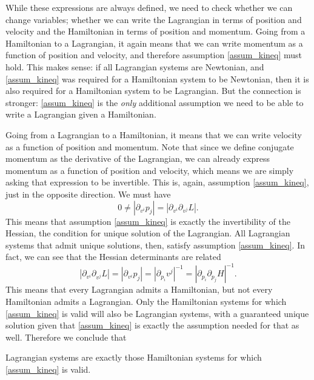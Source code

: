 While these expressions are always defined, we need to check whether we can change variables; whether we can write the Lagrangian in terms of position and velocity and the Hamiltonian in terms of position and momentum. Going from a Hamiltonian to a Lagrangian, it again means that we can write momentum as a function of position and velocity, and therefore assumption \ref{assum_kineq} must hold. This makes sense: if all Lagrangian systems are Newtonian, and \ref{assum_kineq} was required for a Hamiltonian system to be Newtonian, then it is also required for a Hamiltonian system to be Lagrangian. But the connection is stronger: \ref{assum_kineq} is the \emph{only} additional assumption we need to be able to write a Lagrangian given a Hamiltonian.

Going from a Lagrangian to a Hamiltonian, it means that we can write velocity as a function of position and momentum. Note that since we define conjugate momentum as the derivative of the Lagrangian, we can already express momentum as a function of position and velocity, which means we are simply asking that expression to be invertible. This is, again, assumption \ref{assum_kineq}, just in the opposite direction. We must have
\begin{equation}
	0 \neq \left| \partial_{v^i} p_j \right| = \left| \partial_{v^i} \partial_{v^j} L \right|.
\end{equation}
This means that assumption \ref{assum_kineq} is exactly the invertibility of the Hessian, the condition for unique solution of the Lagrangian. All Lagrangian systems that admit unique solutions, then, satisfy assumption \ref{assum_kineq}. In fact, we can see that the Hessian determinants are related
\begin{equation}
	\left| \partial_{v^i} \partial_{v^j} L \right| = \left| \partial_{v^i} p_j \right| = \left| \partial_{p_i} v^j \right|^{-1} = \left|\partial_{p_i}\partial_{p_j} H\right|^{-1}.
\end{equation}
This means that every Lagrangian admits a Hamiltonian, but not every Hamiltonian admits a Lagrangian. Only the Hamiltonian systems for which \ref{assum_kineq} is valid will also be Lagrangian systems, with a guaranteed unique solution given that \ref{assum_kineq} is exactly the assumption needed for that as well. Therefore we conclude that
\begin{insight}
	Lagrangian systems are exactly those Hamiltonian systems for which \ref{assum_kineq} is valid.
\end{insight}

